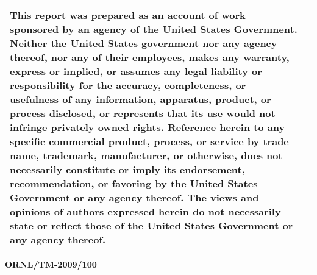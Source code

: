 \begin{longtable}{|p{4.443in}|p{0.057in}|}
\hline
\begin{minipage}[t]{4.443in}\raggedright %
{\small This report was prepared as an account of work sponsored by an agency of 
the United States Government. Neither the United States government nor any agency 
thereof, nor any of their employees, makes any warranty, express or implied, or 
assumes any legal liability or responsibility for the accuracy, completeness, or 
usefulness of any information, apparatus, product, or process disclosed, or represents 
that its use would not infringe privately owned rights. Reference herein to any 
specific commercial product, process, or service by trade name, trademark, manufacturer, 
or otherwise, does not necessarily constitute or imply its endorsement, recommendation, 
or favoring by the United States Government or any agency thereof. The views and 
opinions of authors expressed herein do not necessarily state or reflect those 
of the United States Government or any agency thereof.}\end{minipage}\\
\hline
\end{longtable}
\pagebreak{}

\vspace{12pt}
\begin{flushright}
{\color{color08} \textbf{ORNL/TM-2009/100\label{HToc533553247}\label{HToc6041549}\label{HToc6042388}\label{HToc8548020}\label{HToc528144461}\label{HToc528743868}\label{HToc528745033}}}
\end{flushright}

